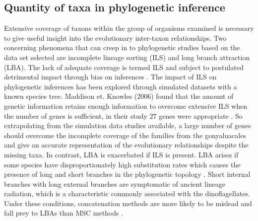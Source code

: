 \documentclass[12pt]{article}
\begin{document}
\subsection*{Quantity of taxa in phylogenetic inference}
Extensive coverage of taxons within the group of organisms examined is necessary to give useful insight into the evolutionary inter-taxon relationships.
Two concerning phenomena that can creep in to phylogenetic studies based on the data set selected are incomplete lineage sorting (ILS) and long branch attraction (LBA). 
The lack of adequate coverage is termed ILS and subject to postulated detrimental impact through bias on inferences \cite{heath2008taxon}. 
The impact of ILS on phylogenetic inferences has been explored through simulated datasets with a known species tree. 
Maddison et. Knowles (2006) found that the amount of genetic information retains enough information to overcome extensive ILS when the number of genes is sufficient, in their study 27 genes were appropriate \cite{maddison2006inferring}. 
So extrapolating from the simulation data studies available, a large number of genes should overcome the incomplete coverage of the families from the gonyaluacales and give an accurate representation of the evolutionary relationships despite the missing taxa. 
In contrast, LBA is exacerbated if ILS is present. 
LBA arises if some species have disproportionately high substitution rates which causes the presence of long and short branches in the phylogenetic topology \cite{liu2014coalescent}. 
Short internal branches with long external branches are symptomatic of ancient lineage radiation, which is a characteristic commonly associated with the dinoflagellates. 
Under these conditions, concatenation methods are more likely to be mislead and fall prey to LBAs than MSC methods \cite{liu2014coalescent}.
\end{document}
